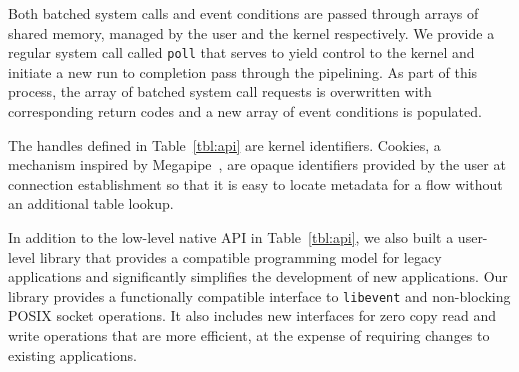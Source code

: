 Both batched system calls and event conditions are passed through
arrays of shared memory, managed by the user and the kernel respectively.
We provide a regular system call called \texttt{poll} that serves
to yield control to the kernel and initiate a new run to completion
pass through the \ix pipelining. As part of this process, the array
of batched system call requests is overwritten with corresponding return
codes and a new array of event conditions is populated.

 The handles defined in Table~\ref{tbl:api} are kernel
identifiers. Cookies, a mechanism inspired by Megapipe~\cite{han2012megapipe},
are opaque identifiers provided by the user at connection establishment
so that it is easy to locate metadata for a flow without an additional table lookup.


In addition to the low-level native \ix API in Table~\ref{tbl:api}, we
also built a user-level library that provides a compatible programming
model for legacy applications and significantly simplifies the
development of new applications. Our library provides a functionally
compatible interface to \texttt{libevent} and non-blocking POSIX
socket operations. It also includes new interfaces for zero copy read
and write operations that are more efficient, at the expense of
requiring changes to existing applications. 

 


